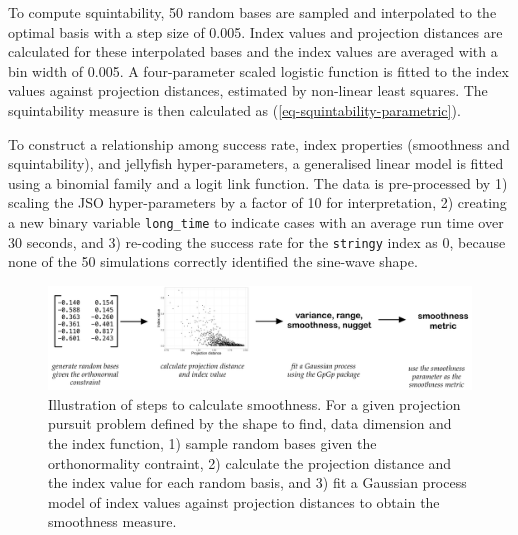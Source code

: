 \documentclass[
  12pt,
]{interact}
\theoremstyle{plain}
\begin{document}
To compute squintability, 50 random bases are sampled and interpolated
to the optimal basis with a step size of 0.005. Index values and
projection distances are calculated for these interpolated bases and the
index values are averaged with a bin width of 0.005. A four-parameter
scaled logistic function is fitted to the index values against
projection distances, estimated by non-linear least squares. The
squintability measure is then calculated as
(\ref{eq-squintability-parametric}).

To construct a relationship among success rate, index properties
(smoothness and squintability), and jellyfish hyper-parameters, a
generalised linear model is fitted using a binomial family and a logit
link function. The data is pre-processed by 1) scaling the JSO
hyper-parameters by a factor of 10 for interpretation, 2) creating a new
binary variable \texttt{long\_time} to indicate cases with an average
run time over 30 seconds, and 3) re-coding the success rate for the
\texttt{stringy} index as 0, because none of the 50 simulations
correctly identified the sine-wave shape.

\begin{figure}

{\centering \includegraphics[width=1\textwidth,height=\textheight]{figures/smoothness.png}

}

\caption{\label{fig-smoothness}Illustration of steps to calculate
smoothness. For a given projection pursuit problem defined by the shape
to find, data dimension and the index function, 1) sample random bases
given the orthonormality contraint, 2) calculate the projection distance
and the index value for each random basis, and 3) fit a Gaussian process
model of index values against projection distances to obtain the
smoothness measure.}

\end{figure}
\end{document}
